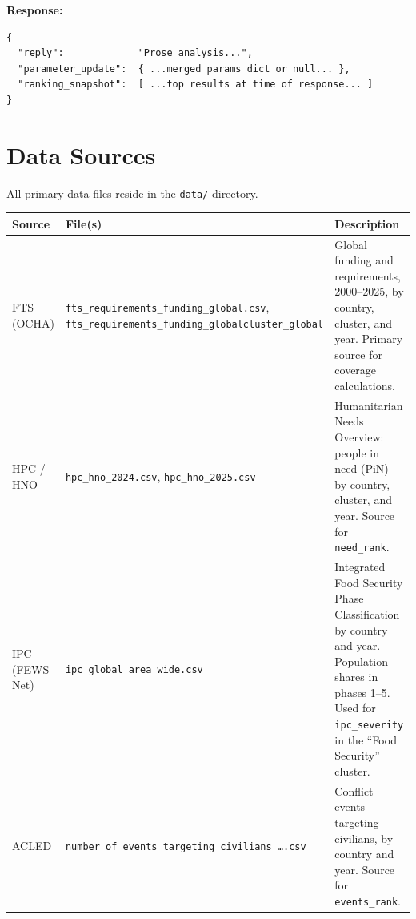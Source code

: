 \documentclass[11pt,a4paper]{article}
\newcommand{\code}[1]{\texttt{#1}}
\begin{document}
\textbf{Response:}
\begin{lstlisting}[language={}]
{
  "reply":             "Prose analysis...",
  "parameter_update":  { ...merged params dict or null... },
  "ranking_snapshot":  [ ...top results at time of response... ]
}
\end{lstlisting}

\section{Data Sources}

All primary data files reside in the \code{data/} directory.

\begin{longtable}{p{2cm}p{8.5cm}p{6cm}}
  \toprule
  \textbf{Source}                                                        & \textbf{File(s)} & \textbf{Description} \\
  \midrule
  \endhead
  \bottomrule
  \endfoot
  FTS (OCHA)                                                             &
  \texttt{fts\_requirements\_funding\_global.csv},
  \texttt{fts\_requirements\_\allowbreak funding\_globalcluster\_global} &
  Global funding and requirements, 2000--2025, by country, cluster, and year.
  Primary source for coverage calculations.                                                                        \\[4pt]

  HPC / HNO                                                              &
  \texttt{hpc\_hno\_2024.csv},
  \texttt{hpc\_hno\_2025.csv}                                            &
  Humanitarian Needs Overview: people in need (PiN) by country, cluster, and year.
  Source for \code{need\_rank}.                                                                                    \\[4pt]

  IPC (FEWS Net)                                                         &
  \texttt{ipc\_global\_area\_wide.csv}                                   &
  Integrated Food Security Phase Classification by country and year.
  Population shares in phases 1--5.
  Used for \code{ipc\_severity} in the ``Food Security'' cluster.                                                  \\[4pt]

  ACLED                                                                  &
  \texttt{number\_of\_events\_targeting\_civilians\_\ldots.csv}          &
  Conflict events targeting civilians, by country and year.
  Source for \code{events\_rank}.                                                                                  \\[4pt]
\end{longtable}
\end{document}
